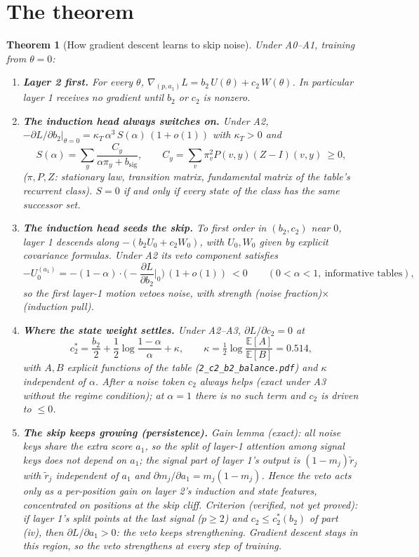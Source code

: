 \documentclass[11pt]{article}
\newtheorem{theorem}{Theorem}
\theoremstyle{definition}\newtheorem{assumption}{Assumption}
\theoremstyle{remark}\newtheorem{remark}{Remark}
\newcommand{\1}{\mathbf{1}}
\begin{document}
\section{The theorem}
\begin{theorem}[How gradient descent learns to skip noise]\label{thm}
Under A0--A1, training from $\theta=0$:
\begin{enumerate}[label=(\roman*),leftmargin=2em]
\item \textbf{Layer 2 first.} For every $\theta$, $\nabla_{(p,a_1)}L=b_2\,U(\theta)+c_2\,W(\theta)$. In
particular layer 1 receives no gradient until $b_2$ or $c_2$ is nonzero.

\item \textbf{The induction head always switches on.} Under A2,
$-\partial L/\partial b_2\big|_{\theta=0}=\kappa_T\,\alpha^3\,S(\alpha)\,(1+o(1))$ with $\kappa_T>0$ and
\[
S(\alpha)=\sum_y\frac{C_y}{\alpha\pi_y+b_{\mathrm{sig}}},\qquad C_y=\sum_v\pi_v^2P(v,y)(Z-I)(v,y)\ \ge0,
\]
($\pi,P,Z$: stationary law, transition matrix, fundamental matrix of the table's recurrent class).
$S=0$ if and only if every state of the class has the same successor set.

\item \textbf{The induction head seeds the skip.} To first order in $(b_2,c_2)$ near $0$, layer 1
descends along $-(b_2U_0+c_2W_0)$, with $U_0,W_0$ given by explicit covariance formulas. Under A2 its
veto component satisfies
\[
-U_0^{(a_1)}=-(1-\alpha)\cdot\Big(-\frac{\partial L}{\partial b_2}\Big|_0\Big)\,(1+o(1))\ <0
\qquad(0<\alpha<1,\ \text{informative tables}),
\]
so the first layer-1 motion vetoes noise, with strength (noise fraction)$\times$(induction pull).

\item \textbf{Where the state weight settles.} Under A2--A3, $\partial L/\partial c_2=0$ at
\[
c_2^\ast=\frac{b_2}{2}+\frac12\log\frac{1-\alpha}{\alpha}+\kappa,\qquad
\kappa=\tfrac12\log\frac{\mathbb E[A]}{\mathbb E[B]}=0.514,
\]
with $A,B$ explicit functions of the table (\texttt{2\_c2\_b2\_balance.pdf}) and $\kappa$ independent of
$\alpha$. After a noise token $c_2$ always helps (exact under A3 without the regime condition);
at $\alpha=1$ there is no such term and $c_2$ is driven to $\le0$.

\item \textbf{The skip keeps growing (persistence).} \emph{Gain lemma (exact):} all noise keys
share the extra score $a_1$, so the split of layer-1 attention among signal keys does not depend on
$a_1$; the signal part of layer 1's output is $(1-m_j)\tilde r_j$ with $\tilde r_j$ independent of
$a_1$ and $\partial m_j/\partial a_1=m_j(1-m_j)$. Hence the veto acts only as a per-position gain on
layer 2's induction and state features, concentrated on positions at the skip cliff.
\emph{Criterion (verified, not yet proved):} if layer 1's split points at the last signal
($p\ge2$) and $c_2\le c_2^\ast(b_2)$ of part (iv), then $\partial L/\partial a_1>0$: the veto keeps
strengthening. Gradient descent stays in this region, so the veto strengthens at every step of training.


\end{enumerate}
\end{theorem}
\end{document}
